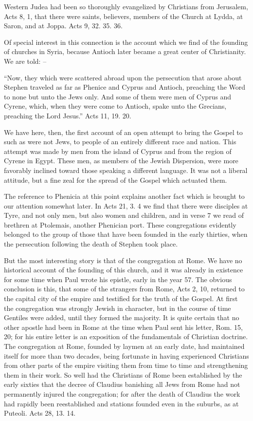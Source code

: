 \documentclass[
]{book}
\begin{document}
Western Judea had been so thoroughly evangelized by Christians from Jerusalem, Acts 8, 1, that there were saints, believers, members of the Church at Lydda, at Saron, and at Joppa. Acts 9, 32. 35. 36.

Of special interest in this connection is the account which we find of the founding of churches in Syria, because Antioch later became a great center of Christianity. We are told: --

``Now, they which were scattered abroad upon the persecution that arose about Stephen traveled as far as Phenice and Cyprus and Antioch, preaching the Word to none but unto the Jews only. And some of them were men of Cyprus and Cyrene, which, when they were come to Antioch, spake unto the Grecians, preaching the Lord Jesus.'' Acts 11, 19. 20.

We have here, then, the first account of an open attempt to bring the Gospel to such as were not Jews, to people of an entirely different race and nation. This attempt was made by men from the island of Cyprus and from the region of Cyrene in Egypt. These men, as members of the Jewish Dispersion, were more favorably inclined toward those speaking a different language. It was not a liberal attitude, but a fine zeal for the spread of the Gospel which actuated them.

The reference to Phenicia at this point explains another fact which is brought to our attention somewhat later. In Acts 21, 3. 4 we find that there were disciples at Tyre, and not only men, but also women and children, and in verse 7 we read of brethren at Ptolemais, another Phenician port. These congregations evidently belonged to the group of those that have been founded in the early thirties, when the persecution following the death of Stephen took place.

But the most interesting story is that of the congregation at Rome. We have no historical account of the founding of this church, and it was already in existence for some time when Paul wrote his epistle, early in the year 57. The obvious conclusion is this, that some of the strangers from Rome, Acts 2, 10, returned to the capital city of the empire and testified for the truth of the Gospel. At first the congregation was strongly Jewish in character, but in the course of time Gentiles were added, until they formed the majority. It is quite certain that no other apostle had been in Rome at the time when Paul sent his letter, Rom. 15, 20; for his entire letter is an exposition of the fundamentals of Christian doctrine. The congregation at Rome, founded by laymen at an early date, had maintained itself for more than two decades, being fortunate in having experienced Christians from other parts of the empire visiting them from time to time and strengthening them in their work. So well had the Christians of Rome been established by the early sixties that the decree of Claudius banishing all Jews from Rome had not permanently injured the congregation; for after the death of Claudius the work had rapidly been reestablished and stations founded even in the suburbs, as at Puteoli. Acts 28, 13. 14.
\end{document}
